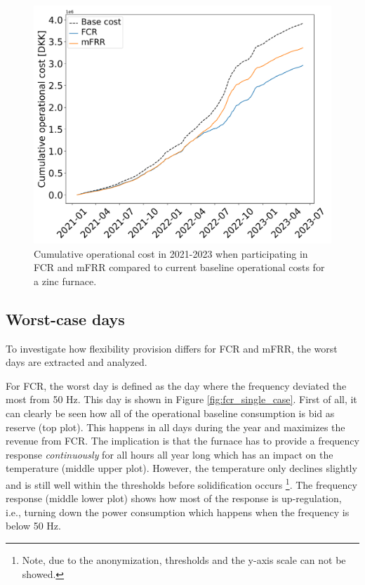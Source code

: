 \documentclass[sigconf]{acmart}
\begin{document}
\begin{figure}[t]
    \centering
    \includegraphics[width=\columnwidth]{figures/cumulative_cost_comparison.png}
    \caption{Cumulative operational cost in 2021-2023 when participating in FCR and mFRR compared to current baseline operational costs for a zinc furnace.}
    \label{fig:cumulative_cost_comparison}
\end{figure}

\subsection{Worst-case days}

To investigate how flexibility provision differs for FCR and mFRR, the worst days are extracted and analyzed.

For FCR, the worst day is defined as the day where the frequency deviated the most from 50 Hz. This day is shown in Figure \ref{fig:fcr_single_case}. First of all, it can clearly be seen how all of the operational baseline consumption is bid as reserve (top plot). This happens in all days during the year and maximizes the revenue from FCR. The implication is that the furnace has to provide a frequency response \textit{continuously} for all hours all year long which has an impact on the temperature (middle upper plot). However, the temperature only declines slightly and is still well within the thresholds before solidification occurs \footnote{Note, due to the anonymization, thresholds and the y-axis scale can not be showed.}. The frequency response (middle lower plot) shows how most of the response is up-regulation, i.e., turning down the power consumption which happens when the frequency is below 50 Hz.
\end{document}

